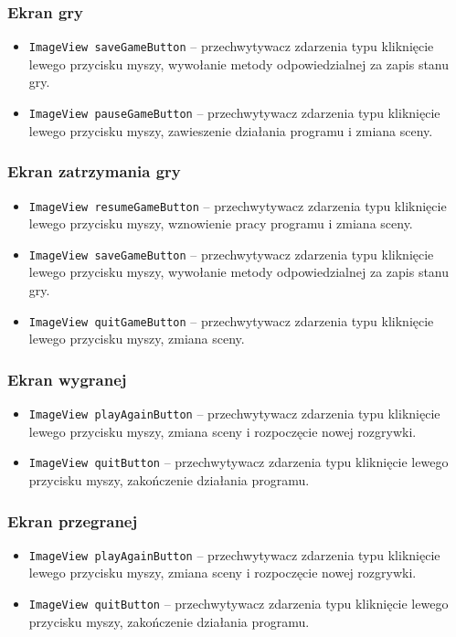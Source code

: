 \documentclass[a4paper]{article}
\newcommand{\prog}{\texttt}
\begin{document}
\subsubsection{Ekran gry}
\begin{itemize}
    \item \prog{ImageView saveGameButton} -- przechwytywacz zdarzenia typu kliknięcie lewego przycisku myszy, wywołanie metody odpowiedzialnej za zapis stanu gry.
    \item \prog{ImageView pauseGameButton} -- przechwytywacz zdarzenia typu kliknięcie lewego przycisku myszy, zawieszenie działania programu i zmiana sceny.
\end{itemize}

\subsubsection{Ekran zatrzymania gry}
\begin{itemize}
    \item \prog{ImageView resumeGameButton} -- przechwytywacz zdarzenia typu kliknięcie lewego przycisku myszy, wznowienie pracy programu i zmiana sceny.
    \item \prog{ImageView saveGameButton} -- przechwytywacz zdarzenia typu kliknięcie lewego przycisku myszy, wywołanie metody odpowiedzialnej za zapis stanu gry.
    \item \prog{ImageView quitGameButton} -- przechwytywacz zdarzenia typu kliknięcie lewego przycisku myszy, zmiana sceny.
\end{itemize}

\subsubsection{Ekran wygranej}
\begin{itemize}
    \item \prog{ImageView playAgainButton} -- przechwytywacz zdarzenia typu kliknięcie lewego przycisku myszy, zmiana sceny i rozpoczęcie nowej rozgrywki.
    \item \prog{ImageView quitButton} -- przechwytywacz zdarzenia typu kliknięcie lewego przycisku myszy, zakończenie działania programu.
\end{itemize}

\subsubsection{Ekran przegranej}
\begin{itemize}
    \item \prog{ImageView playAgainButton} -- przechwytywacz zdarzenia typu kliknięcie lewego przycisku myszy, zmiana sceny i rozpoczęcie nowej rozgrywki.
    \item \prog{ImageView quitButton} -- przechwytywacz zdarzenia typu kliknięcie lewego przycisku myszy, zakończenie działania programu.
\end{itemize}
\end{document}
